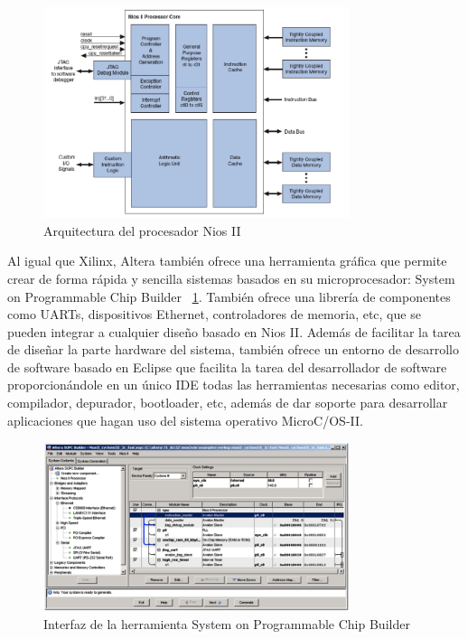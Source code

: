 \begin{figure}[h!]
 	\begin{center}
  	\includegraphics[width=0.8\textwidth,keepaspectratio=true]{./images/nios2}
  	\caption{Arquitectura del procesador Nios II}
 	\end{center}
	\end{figure}

Al igual que Xilinx, Altera también ofrece una herramienta gráfica que permite crear de forma rápida y sencilla sistemas basados en su microprocesador: System on Programmable Chip Builder \cite{Etiqueta28}~\ref{fig:System on Programmable Chip Builder}. También ofrece una librería de componentes como UARTs, dispositivos Ethernet, controladores de memoria, etc, que se pueden integrar a cualquier diseño basado en Nios II.
Además de facilitar la tarea de diseñar la parte hardware del sistema, también ofrece un entorno de desarrollo de software basado en Eclipse que facilita la tarea del desarrollador de software proporcionándole en un único IDE todas las herramientas necesarias como editor, compilador, depurador, bootloader, etc, además de dar soporte para desarrollar aplicaciones que hagan uso del sistema operativo MicroC/OS-II.

	\begin{figure}[h!]
 	\begin{center}
  	\includegraphics[width=0.8\textwidth,keepaspectratio=true]{./images/herramientasnios2}
  	\caption{Interfaz de la herramienta System on Programmable Chip Builder}
  	\label{fig:System on Programmable Chip Builder}
 	\end{center}
	\end{figure}
\newpage
